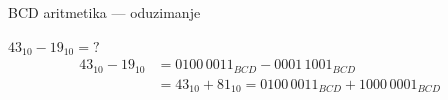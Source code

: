 \begin{frame}[label=06-s006]{BCD aritmetika — oduzimanje}

$43_{10}-19_{10}={?}$
\[\begin{aligned}43_{10}-19_{10}&=0100\,0011_{BCD}-0001\,1001_{BCD}\\&=43_{10}+81_{10}=0100\,0011_{BCD}+1000\,0001_{BCD}\end{aligned}\]
\begin{center}\end{center}
\end{frame}

